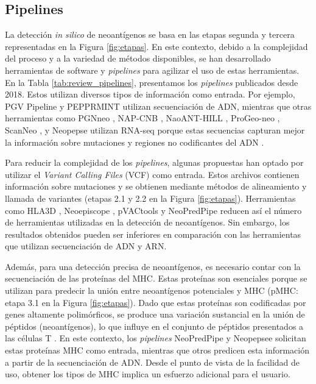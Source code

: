 \subsection{Pipelines}

La detección \textit{in silico} de neoantígenos se basa en las etapas segunda y tercera representadas en la Figura \ref{fig:etapas}. En este contexto, debido a la complejidad del proceso y a la variedad de métodos disponibles, se han desarrollado herramientas de software y \textit{pipelines} para agilizar el uso de estas herramientas. En la Tabla \ref{tab:review_pipelines}, presentamos los \textit{pipelines} publicados desde 2018. Estos utilizan diversos tipos de información como entrada. Por ejemplo, PGV Pipeline \cite{rubinsteyn2018computational} y PEPPRMINT \cite{zhou2023prioritizing} utilizan secuenciación de ADN, mientras que otras herramientas como PGNneo \cite{tan2023pgnneo}, NAP-CNB \cite{wert2021predicting}, NaoANT-HILL \cite{coelho2020neoant}, ProGeo-neo \cite{li2020progeo}, ScanNeo \cite{wang2019scanneo}, y Neopepse \cite{kim2018neopepsee} utilizan RNA-seq porque estas secuencias capturan mejor la información sobre mutaciones y regiones no codificantes del ADN \cite{tan2023pgnneo}.

Para reducir la complejidad de los \textit{pipelines}, algunas propuestas han optado por utilizar el \textit{Variant Calling Files} (VCF) como entrada. Estos archivos contienen información sobre mutaciones y se obtienen mediante métodos de alineamiento y llamada de variantes (etapas 2.1 y 2.2 en la Figura \ref{fig:etapas}). Herramientas como HLA3D \cite{li2022hla3d}, Neoepiscope \cite{wood2020neoepiscope}, pVACtools \cite{hundal2020pvactools} y NeoPredPipe \cite{schenck2019neopredpipe} reducen así el número de herramientas utilizadas en la detección de neoantígenos. Sin embargo, los resultados obtenidos pueden ser inferiores en comparación con las herramientas que utilizan secuenciación de ADN y ARN.

Además, para una detección precisa de neoantígenos, es necesario contar con la secuenciación de las proteínas del  MHC. Estas proteínas son esenciales porque se utilizan para predecir la unión entre neoantígenos potenciales y MHC (pMHC: etapa 3.1 en la Figura \ref{fig:etapas}). Dado que estas proteínas son codificadas por genes altamente polimórficos, se produce una variación sustancial en la unión de péptidos (neoantígenos), lo que influye en el conjunto de péptidos presentados a las células T \cite{abualrous2021major}. En este contexto, los \textit{pipelines} NeoPredPipe \cite{schenck2019neopredpipe} y Neopepsee \cite{kim2018neopepsee} solicitan estas proteínas MHC como entrada, mientras que otros predicen esta información a partir de la secuenciación de ADN. Desde el punto de vista de la facilidad de uso, obtener los tipos de MHC implica un esfuerzo adicional para el usuario.

